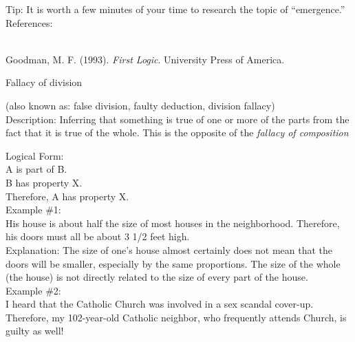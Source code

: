 \documentclass[a4paper,12pt,single,pdftex]{scrartcl}
\begin{document}
    
      Tip: It is worth a few minutes of your time to research the topic of “emergence.” 
    \\

    References:

    
      
        
      \\

      
        
          Goodman, M. F. (1993). {\it First Logic}. University Press of America.
        
      
    
  

Fallacy of division
    
      (also known as: false division, faulty deduction, division fallacy)
    \\

  
    Description: Inferring that something is true of one or more of the parts from the fact that it is true of the whole.  This is the opposite of the {\it fallacy of composition} 

    
      Logical Form:
    \\

    
      A is part of B.
    \\

    
      B has property X.
    \\

    
      Therefore, A has property X.
    \\

    
      Example \#1:
    \\

    
      His house is about half the size of most houses in the neighborhood. Therefore, his doors must all be about 3 1/2 feet high.
    \\

    
      Explanation: The size of one’s house almost certainly does not mean that the doors will be smaller, especially by the same proportions.  The size of the whole (the house) is not directly related to the size of every part of the house.
    \\

    
      Example \#2:
    \\

    
      I heard that the Catholic Church was involved in a sex scandal cover-up.  Therefore, my 102-year-old Catholic neighbor, who frequently attends Church, is guilty as well!
    \\
\end{document}
